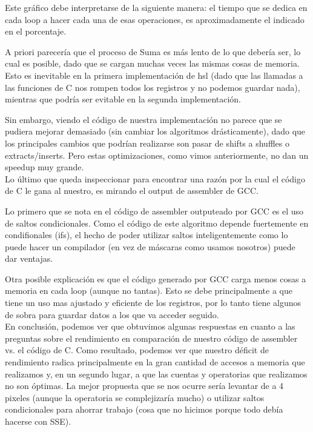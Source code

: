 Este gráfico debe interpretarse de la siguiente manera: el tiempo que se dedica en cada loop a hacer cada una de esas operaciones, es aproximadamente el indicado en el porcentaje.

A priori parecería que el proceso de Suma es más lento de lo que debería ser, lo cual es posible, dado que se cargan muchas veces las mismas cosas de memoria. Esto es inevitable en la primera implementación de hsl (dado que las llamadas a las funciones de C nos rompen todos los registros y no podemos guardar nada), mientras que podría ser evitable en la segunda implementación.

Sin embargo, viendo el código de nuestra implementación no parece que se pudiera mejorar demasiado (sin cambiar los algoritmos drásticamente), dado que los principales cambios que podrían realizarse son pasar de shifts a shuffles o extracts/inserts. Pero estas optimizaciones, como vimos anteriormente, no dan un speedup muy grande.
\\

Lo último que queda inspeccionar para encontrar una razón por la cual el código de C le gana al nuestro, es mirando el output de assembler de GCC. 

Lo primero que se nota en el código de assembler outputeado por GCC es el uso de saltos condicionales. Como el código de este algoritmo depende fuertemente en condifionales (ifs), el hecho de poder utilizar saltos inteligentemente como lo puede hacer un compilador (en vez de máscaras como usamos nosotros) puede dar ventajas.

Otra posible explicación es que el código generado por GCC carga menos cosas a memoria en cada loop (aunque no tantas). Esto se debe principalmente a que tiene un uso mas ajustado y eficiente de los registros, por lo tanto tiene algunos de sobra para guardar datos a los que va acceder seguido.
\\

En conclusión, podemos ver que obtuvimos algunas respuestas en cuanto a las preguntas sobre el rendimiento en comparación de nuestro código de assembler vs. el código de C. Como resultado, podemos ver que nuestro déficit de rendimiento radica principalmente en la gran cantidad de accesos a memoria que realizamos y, en un segundo lugar, a que las cuentas y operatorias que realizamos no son óptimas.
La mejor propuesta que se nos ocurre sería levantar de a 4 pixeles (aunque la operatoria se complejizaría mucho) o utilizar saltos condicionales para ahorrar trabajo (cosa que no hicimos porque todo debía hacerse con SSE).
\\

